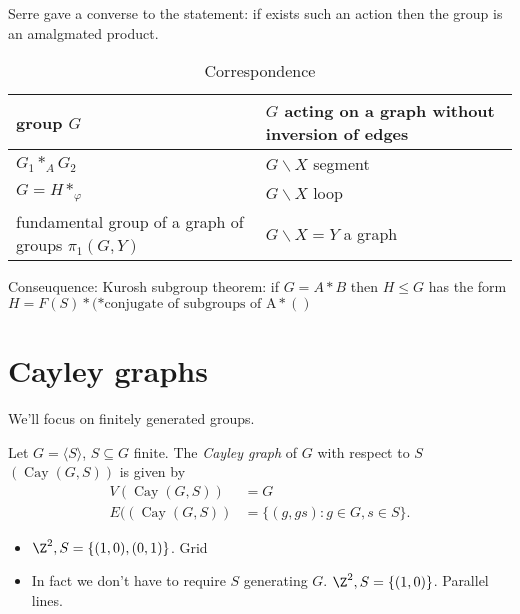 \documentclass[a4paper]{article}
\DeclareMathOperator{\Cay}{Cay} %
\begin{document}
Serre gave a converse to the statement: if exists such an action then the group is an amalgmated product.

\begin{table}[h]
  \centering
  \begin{tabular}{p{5cm}|p{5cm}}
    group \(G\) & \(G\) acting on a graph without inversion of edges \\ \hline
    \(G_1 *_A G_2\) & \(G \backslash X\) segment \\ \hline
    \(G = H *_\varphi\) & \(G \backslash X\) loop \\ \hline
    fundamental group of a graph of groups \(\pi_1(G, Y)\) & \(G \backslash X = Y\) a graph
  \end{tabular}
  \caption{Correspondence}
\end{table}

Conseuquence: Kurosh subgroup theorem: if \(G = A * B\) then \(H \leq G\) has the form \(H = F(S) * (* \text{conjugate of subgroups of A} * ()\)

\section{Cayley graphs}

We'll focus on finitely generated groups.

\begin{definition}
  Let \(G = \langle S\rangle\), \(S \subseteq G\) finite. The \emph{Cayley graph} of \(G\) with respect to \(S\) \((\Cay(G, S))\) is given by
  \begin{align*}
    V(\Cay(G, S)) &= G \\
    E((\Cay(G, S)) &= \{(g, gs): g \in G, s \in S\}.
  \end{align*}
\end{definition}

\begin{eg}\leavevmode
  \begin{itemize}
  \item \(\Z^2, S = \{(1, 0), (0, 1)\}\). Grid
  \item In fact we don't have to require \(S\) generating \(G\). \(\Z^2, S = \{(1, 0)\}\). Parallel lines.
  \end{itemize}
\end{eg}
\end{document}
